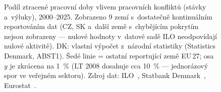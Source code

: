 \def\strStavStavkyTitle{Ztracená pracovní doba vlivem pracovních konfliktů}%
\def\strStavStavkyYlabel{ztracená pracovní doba [\%]}%
\def\strStavStavkyCaption{Podíl ztracené pracovní doby vlivem pracovních konfliktů (stávky a~výluky), 2000--2025. Zobrazeno 9 zemí s~dostatečně kontinuálním reportováním dat (CZ, SK a~další země s~chybějícím pokrytím nejsou zobrazeny --- nulové hodnoty v~datové sadě \ac{ILO} neodpovídají nulové aktivitě). DK: vlastní výpočet z~národní statistiky (Statistics Denmark, ABST1). Šedé linie = ostatní reportující země EU\,27; osa $y$ je zkrácena na \SI{1}{\percent} (LT 2008 dosahuje cca \SI{10}{\percent} --- jednorázový spor ve veřejném sektoru). Zdroj dat: ILO~\cite{ilostat_STR_DAYS_ECO_RT_A}, Statbank Denmark~\cite{dst_abst1}, Eurostat~\cite{eurostat_lfsa_ewhun2}.}%
%

\providecommand\NudgeStavStavkyDe{0pt}%
\providecommand\NudgeStavStavkyEs{0pt}%
\providecommand\NudgeStavStavkyFi{0pt}%
\providecommand\NudgeStavStavkyFr{0pt}%
\providecommand\NudgeStavStavkyHu{0pt}%
\providecommand\NudgeStavStavkyLv{0pt}%
\providecommand\NudgeStavStavkyPl{0pt}%
\providecommand\NudgeStavStavkySe{0pt}%
\providecommand\NudgeStavStavkyDk{0pt}%
\begin{figure}[H]
  \centering
  
  \caption{\strStavStavkyCaption}
  \label{fig:stav_stavky}
\end{figure}
